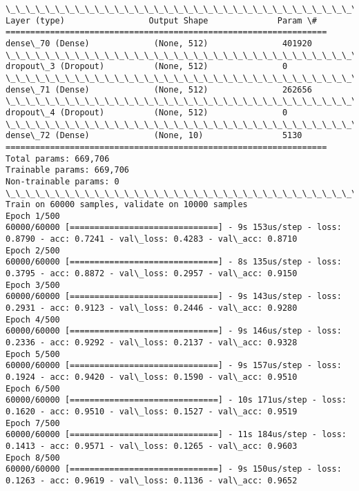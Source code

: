 \documentclass[11pt]{article}
\begin{document}
    \begin{Verbatim}[commandchars=\\\{\}]
\_\_\_\_\_\_\_\_\_\_\_\_\_\_\_\_\_\_\_\_\_\_\_\_\_\_\_\_\_\_\_\_\_\_\_\_\_\_\_\_\_\_\_\_\_\_\_\_\_\_\_\_\_\_\_\_\_\_\_\_\_\_\_\_\_
Layer (type)                 Output Shape              Param \#   
=================================================================
dense\_70 (Dense)             (None, 512)               401920    
\_\_\_\_\_\_\_\_\_\_\_\_\_\_\_\_\_\_\_\_\_\_\_\_\_\_\_\_\_\_\_\_\_\_\_\_\_\_\_\_\_\_\_\_\_\_\_\_\_\_\_\_\_\_\_\_\_\_\_\_\_\_\_\_\_
dropout\_3 (Dropout)          (None, 512)               0         
\_\_\_\_\_\_\_\_\_\_\_\_\_\_\_\_\_\_\_\_\_\_\_\_\_\_\_\_\_\_\_\_\_\_\_\_\_\_\_\_\_\_\_\_\_\_\_\_\_\_\_\_\_\_\_\_\_\_\_\_\_\_\_\_\_
dense\_71 (Dense)             (None, 512)               262656    
\_\_\_\_\_\_\_\_\_\_\_\_\_\_\_\_\_\_\_\_\_\_\_\_\_\_\_\_\_\_\_\_\_\_\_\_\_\_\_\_\_\_\_\_\_\_\_\_\_\_\_\_\_\_\_\_\_\_\_\_\_\_\_\_\_
dropout\_4 (Dropout)          (None, 512)               0         
\_\_\_\_\_\_\_\_\_\_\_\_\_\_\_\_\_\_\_\_\_\_\_\_\_\_\_\_\_\_\_\_\_\_\_\_\_\_\_\_\_\_\_\_\_\_\_\_\_\_\_\_\_\_\_\_\_\_\_\_\_\_\_\_\_
dense\_72 (Dense)             (None, 10)                5130      
=================================================================
Total params: 669,706
Trainable params: 669,706
Non-trainable params: 0
\_\_\_\_\_\_\_\_\_\_\_\_\_\_\_\_\_\_\_\_\_\_\_\_\_\_\_\_\_\_\_\_\_\_\_\_\_\_\_\_\_\_\_\_\_\_\_\_\_\_\_\_\_\_\_\_\_\_\_\_\_\_\_\_\_
Train on 60000 samples, validate on 10000 samples
Epoch 1/500
60000/60000 [==============================] - 9s 153us/step - loss: 0.8790 - acc: 0.7241 - val\_loss: 0.4283 - val\_acc: 0.8710
Epoch 2/500
60000/60000 [==============================] - 8s 135us/step - loss: 0.3795 - acc: 0.8872 - val\_loss: 0.2957 - val\_acc: 0.9150
Epoch 3/500
60000/60000 [==============================] - 9s 143us/step - loss: 0.2931 - acc: 0.9123 - val\_loss: 0.2446 - val\_acc: 0.9280
Epoch 4/500
60000/60000 [==============================] - 9s 146us/step - loss: 0.2336 - acc: 0.9292 - val\_loss: 0.2137 - val\_acc: 0.9328
Epoch 5/500
60000/60000 [==============================] - 9s 157us/step - loss: 0.1924 - acc: 0.9420 - val\_loss: 0.1590 - val\_acc: 0.9510
Epoch 6/500
60000/60000 [==============================] - 10s 171us/step - loss: 0.1620 - acc: 0.9510 - val\_loss: 0.1527 - val\_acc: 0.9519
Epoch 7/500
60000/60000 [==============================] - 11s 184us/step - loss: 0.1413 - acc: 0.9571 - val\_loss: 0.1265 - val\_acc: 0.9603
Epoch 8/500
60000/60000 [==============================] - 9s 150us/step - loss: 0.1263 - acc: 0.9619 - val\_loss: 0.1136 - val\_acc: 0.9652

\end{Verbatim}
\end{document}
